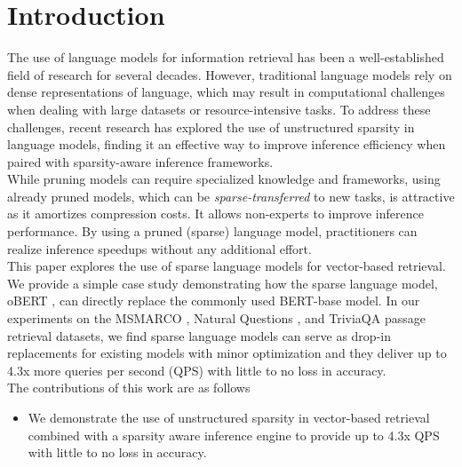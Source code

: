 \documentclass[11pt]{article}
\begin{document}
\section{Introduction}
The use of language models for information retrieval has been a well-established field of research for several decades. However, traditional language models rely on dense representations of language, which may result in computational challenges when dealing with large datasets or resource-intensive tasks. To address these challenges, recent research has explored the use of unstructured sparsity in language models, finding it an effective way to improve inference efficiency when paired with sparsity-aware inference frameworks. \\
While pruning models can require specialized knowledge and frameworks, using already pruned models, which can be \textit{sparse-transferred} to new tasks, is attractive as it amortizes compression costs. It allows non-experts to improve inference performance. By using a pruned (sparse) language model, practitioners can realize inference speedups without any additional effort. \\
This paper explores the use of sparse language models for vector-based retrieval. We provide a simple case study demonstrating how the sparse language model, oBERT \cite{Kurti2022TheOB}, can directly replace the commonly used BERT-base  \cite{Devlin2019BERTPO} model. In our experiments on the MSMARCO \cite{Campos2016MSMA}, Natural Questions \cite{Kwiatkowski2019NaturalQA}, and TriviaQA \cite{Joshi2017TriviaQAAL} passage retrieval datasets, we find sparse language models can serve as drop-in replacements for existing models with minor optimization and they deliver up to 4.3x more queries per second (QPS) with little to no loss in accuracy. \\
The contributions of this work are as follows
\begin{itemize}
    \item We demonstrate the use of unstructured sparsity in vector-based retrieval combined with a sparsity aware inference engine to provide up to 4.3x QPS with little to no loss in accuracy.
\end{itemize}
\end{document}
